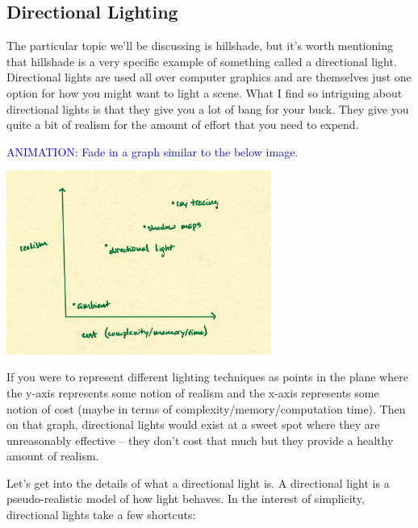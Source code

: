 \documentclass{article}
\newcommand\animation[1]{\textcolor{blue}{ANIMATION: #1}}
\begin{document}
\subsection{Directional Lighting}

The particular topic we'll be discussing is hillshade, but it's worth mentioning that hillshade is a very specific example of something called a directional light.
Directional lights are used all over computer graphics and are themselves just one option for how you might want to light a scene.
What I find so intriguing about directional lights is that they give you a lot of bang for your buck.
They give you quite a bit of realism for the amount of effort that you need to expend.

\animation{Fade in a graph similar to the below image.}

\begin{center}
	\includegraphics[width=0.65\textwidth,frame]{assets/realism.jpg}
\end{center}

If you were to represent different lighting techniques as points in the plane where the y-axis represents some notion of realism and the x-axis represents some notion of cost (maybe in terms of complexity/memory/computation time).
Then on that graph, directional lights would exist at a sweet spot where they are unreasonably effective -- they don't cost that much but they provide a healthy amount of realism.

Let's get into the details of what a directional light is.
A directional light is a pseudo-realistic model of how light behaves.
In the interest of simplicity, directional lights take a few shortcuts:
\end{document}
